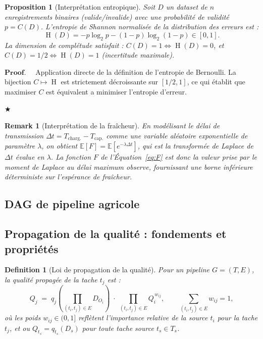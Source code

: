 \documentclass[12pt]{article}
\newtheorem{proposition}{Proposition}[section]
\newtheorem{definition}{Definition}[section]
\newtheorem{remark}{Remark}[section]
\newenvironment{proof}{$\mathbf{Proof.\quad}$}{\begin{flushright}$\bigstar$\end{flushright}}
\DeclareMathOperator{\ent}{H}
\newcommand{\E}{\mathbb{E}}
\begin{document}
	\begin{proposition}[Interprétation entropique]
	\label{prop:entropy}
	Soit $D$ un dataset de $n$ enregistrements binaires (valide/invalide)
	avec une probabilité de validité $p = C(D)$.
	L'entropie de Shannon normalisée de la distribution des erreurs est :
	\[
	\ent(D) = -p\log_2 p - (1-p)\log_2(1-p) \in [0,1].
	\]
	La dimension de complétude satisfait :
	$C(D) = 1 \Leftrightarrow \ent(D) = 0$,
	et $C(D) = 1/2 \Leftrightarrow \ent(D) = 1$ (incertitude maximale).
\end{proposition}

\begin{proof}
	Application directe de la définition de l'entropie de Bernoulli.
	La bijection $C \mapsto \ent$ est strictement décroissante sur
	$[1/2, 1]$, ce qui établit que maximiser $C$ est équivalent a
	minimiser l'entropie d'erreur.
\end{proof}

\begin{remark}[Interprétation de la fraîcheur]
	En modélisant le délai de transmission $\Delta t = T_{\text{charg.}} -
	T_{\text{cap.}}$ comme une variable aléatoire exponentielle de paramètre
	$\lambda$, on obtient $\E[F] = \E[e^{-\lambda\Delta t}]$, qui est
	la transformée de Laplace de $\Delta t$ évalue en $\lambda$.
	La fonction $F$ de l’Équation~\eqref{eq:F} est donc la valeur prise
	par le moment de Laplace au délai maximum observe, fournissant une
	borne inférieure déterministe sur l’espérance de fraîcheur.
\end{remark}
\subsection{DAG de pipeline agricole}
\label{subsec:dag}

\subsection{Propagation de la qualité : fondements et propriétés}
\label{subsec:quality_prop}

\begin{definition}[Loi de propagation de la qualité]
	\label{def:qprop}
	Pour un pipeline $G=(T,E)$, la \emph{qualité propagée} de la tache
	$t_j$ est :
	\begin{equation}
		Q_j \;=\; q_j\!\left(\prod_{(t_i,t_j)\in E} D_{O_i}\right)
		\;\cdot\;
		\prod_{(t_i,t_j)\in E} Q_i^{\,w_{ij}},
		\qquad
		\sum_{(t_i,t_j)\in E} w_{ij} = 1,
		\label{eq:qprop}
	\end{equation}
	où les poids $w_{ij} \in (0,1]$ reflètent l'importance relative de
	la source $t_i$ pour la tache $t_j$, et ou $Q_{t_s} = q_{t_s}(D_s)$
	pour toute tache source $t_s \in T_s$.
\end{definition}
\end{document}
